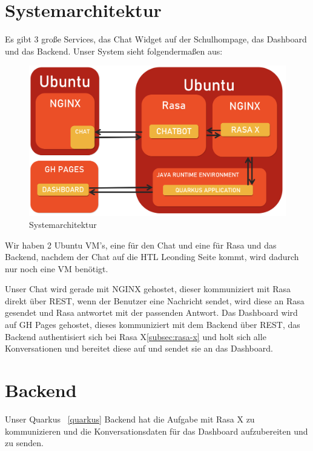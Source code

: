 \section{Systemarchitektur}\label{sec:systemarchitektur}

Es gibt 3 große Services, das Chat Widget auf der Schulhompage, das Dashboard und das Backend.
Unser System sieht folgendermaßen aus:

\begin{figure}[hbt!]
    \centering
    \includegraphics[scale=0.2]{pics/systemarchitektur}
    \caption{Systemarchitektur}
    \label{fig:impl:architektur}
\end{figure}

Wir haben 2 Ubuntu VM's, eine für den Chat und eine für Rasa und das Backend, nachdem der Chat auf die HTL Leonding Seite kommt, wird dadurch nur noch eine VM benötigt.

Unser Chat wird gerade mit NGINX gehostet, dieser kommuniziert mit Rasa direkt über REST, wenn der Benutzer eine Nachricht sendet, wird diese an Rasa gesendet und Rasa antwortet mit der passenden Antwort.
Das Dashboard wird auf GH Pages gehostet, dieses kommuniziert mit dem Backend über REST, das Backend authentisiert sich bei Rasa X\ref{subsec:rasa-x} und holt sich alle Konversationen und bereitet diese auf und sendet sie an das Dashboard.

\section{Backend}\label{sec:backend}

Unser Quarkus ~\ref{quarkus} Backend hat die Aufgabe mit Rasa X zu kommunizieren und die Konversationsdaten für das Dashboard aufzubereiten und zu senden.

